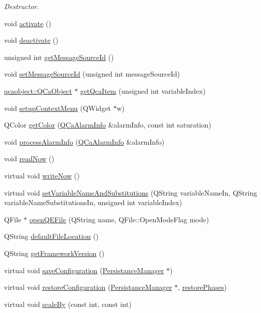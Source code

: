 \begin{DoxyCompactItemize}
\begin{DoxyCompactList}\small\item\em Destructor. \end{DoxyCompactList}\item 
void \hyperlink{classQEWidget_a0990c7f67d2f8211c5225c88c304e708}{activate} ()
\item 
void \hyperlink{classQEWidget_a62917495066efb825c49f4f02e155c50}{deactivate} ()
\item 
unsigned int \hyperlink{classQEWidget_a01c2560967617574a9b03f3487597ffa}{getMessageSourceId} ()
\item 
void \hyperlink{classQEWidget_a2706e4b5748060d22eec1072e0ed0118}{setMessageSourceId} (unsigned int messageSourceId)
\item 
\hyperlink{classqcaobject_1_1QCaObject}{qcaobject::QCaObject} $\ast$ \hyperlink{classQEWidget_a15ffecf019fe409df2a3ab487a185295}{getQcaItem} (unsigned int variableIndex)
\item 
void \hyperlink{classQEWidget_a2acf585f085e2734f0a184a05bf78583}{setupContextMenu} (QWidget $\ast$w)
\item 
QColor \hyperlink{classQEWidget_a0c425f23275370cc852f0f294119d2a8}{getColor} (\hyperlink{classQCaAlarmInfo}{QCaAlarmInfo} \&alarmInfo, const int saturation)
\item 
void \hyperlink{classQEWidget_af12f955eaddc3d26f7396c45f4c19ee1}{processAlarmInfo} (\hyperlink{classQCaAlarmInfo}{QCaAlarmInfo} \&alarmInfo)
\item 
void \hyperlink{classQEWidget_a2296525a294b725e3464b9d1fb46ccce}{readNow} ()
\item 
virtual void \hyperlink{classQEWidget_ac65c36cf29373f3a850d163e7b7c5003}{writeNow} ()
\item 
virtual void \hyperlink{classQEWidget_aad46c00865cd37a2221ea69fbaee8806}{setVariableNameAndSubstitutions} (QString variableNameIn, QString variableNameSubstitutionsIn, unsigned int variableIndex)
\item 
QFile $\ast$ \hyperlink{classQEWidget_a1249c1c022d5ec63e0fa82df20356039}{openQEFile} (QString name, QFile::OpenModeFlag mode)
\item 
QString \hyperlink{classQEWidget_a42e6a3ab3eff6bb67fc046ef381e28e0}{defaultFileLocation} ()
\item 
QString \hyperlink{classQEWidget_a94fb75865de45f884e17ef502c96a5a1}{getFrameworkVersion} ()
\item 
virtual void \hyperlink{classQEWidget_a661ceaf355404437497e21c9db4cb110}{saveConfiguration} (\hyperlink{classPersistanceManager}{PersistanceManager} $\ast$)
\item 
virtual void \hyperlink{classQEWidget_abecc5c5d7dec09547bc5d2acac82190d}{restoreConfiguration} (\hyperlink{classPersistanceManager}{PersistanceManager} $\ast$, \hyperlink{classQEWidget_acff38ca69eed5b30a9d5f9d055e7a0b1}{restorePhases})
\item 
virtual void \hyperlink{classQEWidget_a9ee296007965078d55ddc26ebcc0ef5e}{scaleBy} (const int, const int)
\end{DoxyCompactItemize}
